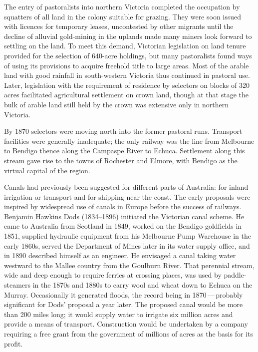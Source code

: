 The entry of pastoralists  into
northern Victoria completed the occupation by squatters
 of all land in the colony suitable for grazing.
They were soon issued with licences for temporary leases, uncontested
by other migrants until the decline of alluvial gold-mining in the
uplands made many miners look forward to settling on the land.  To
meet this demand, Victorian legislation on land tenure provided for
the selection of 640-acre holdings, but many pastoralists found ways
of using its provisions to acquire freehold title to large areas.
Most of the arable land with good rainfall in south-western Victoria
thus continued in pastoral use. Later, legislation with the
requirement of residence by selectors on blocks of 320\,acres
facilitated agricultural settlement on crown land, though at that
stage the bulk of arable land still held by the crown was extensive
only in northern Victoria.

By 1870 selectors were moving north into the former pastoral runs.
Transport facilities were generally inadequate; the only
railway was the line from Melbourne to
Bendigo  thence along the Campaspe River
 to Echuca.    Settlement
along this stream gave rise to the towns of Rochester
 and Elmore,   with Bendigo
as the virtual capital of the region.

Canals had previously been suggested for different parts of Australia:
for inland irrigation or transport and for
shipping near the coast.  The early proposals were inspired by
widespread use of canals in Europe before the success of
railways.  Benjamin Hawkins Dods
  (1834--1896) initiated the Victorian canal
scheme.  He came to Australia from Scotland in 1849,
worked on the Bendigo goldfields in 1851, supplied hydraulic equipment
from his Melbourne Pump Warehouse in the early 1860s, served the
Department of Mines later in its water supply office, and in 1890
described himself as an engineer.  He envisaged a canal taking water
westward to the Mallee country  from the
Goulburn River.  That perennial stream, wide and
deep enough to require ferries at crossing places, was used by
paddle-steamers in the 1870s and
1880s to carry wool and wheat down to Echuca
 on the Murray.  Occasionally
it generated floods, the record being in
1870\,---\,probably significant for Dods' proposal a year later.  The
proposed canal would be more than 200 miles long; it would supply
water to irrigate six million acres and provide a means of transport.
Construction would be undertaken by a company requiring a free grant
from the government of millions of acres as the basis for its
profit.

